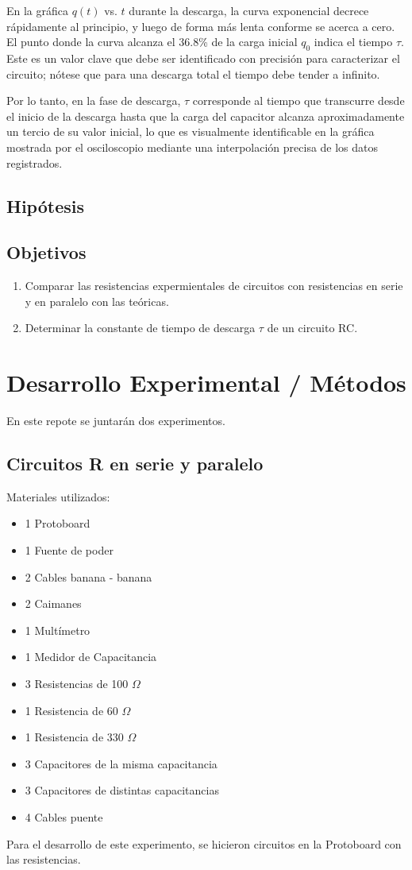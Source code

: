 \documentclass[article,12pt]{elsarticle}
\begin{document}
En la gráfica \(q(t)\) vs. \(t\) durante la descarga, la curva exponencial decrece rápidamente al principio, y luego de forma más lenta conforme se acerca a cero. El punto donde la curva alcanza el 36.8\% de la carga inicial \(q_0\) indica el tiempo \(\tau\). Este es un valor clave que debe ser identificado con precisión para caracterizar el circuito; nótese que para una descarga total el tiempo debe tender a infinito.

Por lo tanto, en la fase de descarga, \(\tau\) corresponde al tiempo que transcurre desde el inicio de la descarga hasta que la carga del capacitor alcanza aproximadamente un tercio de su valor inicial, lo que es visualmente identificable en la gráfica mostrada por el osciloscopio mediante una interpolación precisa de los datos registrados.
    \subsection{Hipótesis}
    \subsection{Objetivos}
        \begin{enumerate}
        \item Comparar las resistencias expermientales de circuitos con resistencias en serie y en paralelo con las teóricas.
        \item Determinar la constante de tiempo de descarga $\tau$ de un circuito RC.
    \end{enumerate}

\section{Desarrollo Experimental / Métodos}
En este repote se juntarán dos experimentos.
    \subsection{Circuitos R en serie y paralelo}
        Materiales utilizados:
        \begin{itemize}
            \item 1 Protoboard
            \item 1 Fuente de poder
            \item 2 Cables banana - banana
            \item 2 Caimanes
            \item 1 Multímetro
            \item 1 Medidor de Capacitancia
            \item 3 Resistencias de 100 $\Omega$
            \item 1 Resistencia de 60 $\Omega$
            \item 1 Resistencia de 330 $\Omega$
            \item 3 Capacitores de la misma capacitancia
            \item 3 Capacitores de distintas capacitancias
            \item 4 Cables puente
        \end{itemize}
    Para el desarrollo de este experimento, se hicieron circuitos en la Protoboard con las resistencias.
\end{document}
